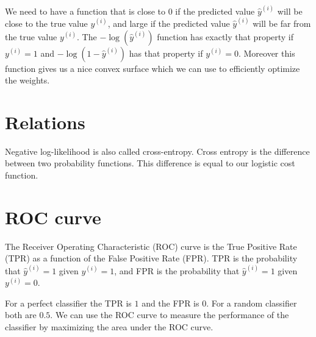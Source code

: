 \documentclass[a4paper]{article}
\begin{document}
We need to have a function that is close to $0$ if the predicted value $\hat{y}^{(i)}$ will be close to the true value $y^{(i)}$, and large if the predicted value $\hat{y}^{(i)}$ will be far from the true value $y^{(i)}$. The $-\log(\hat{y}^{(i)})$ function has exactly that property if $y^{(i)}=1$ and $-\log(1-\hat{y}^{(i)})$ has that property if $y^{(i)}=0$. Moreover this function gives us a nice convex surface which we can use to efficiently optimize the weights.


\section{Relations}
Negative log-likelihood is also called cross-entropy. Cross entropy is the difference between two probability functions. This difference is equal to our logistic cost function.

\section{ROC curve}
The Receiver Operating Characteristic (ROC) curve is the True Positive Rate (TPR) as a function of the False Positive Rate (FPR). TPR is the probability that $\hat{y}^{(i)}=1$ given $y^{(i)}=1$, and FPR is the probability that $\hat{y}^{(i)}=1$ given $y^{(i)}=0$.

For a perfect classifier the TPR is $1$ and the FPR is $0$. For a random classifier both are $0.5$. We can use the ROC curve to measure the performance of the classifier by maximizing the area under the ROC curve.
\end{document}
